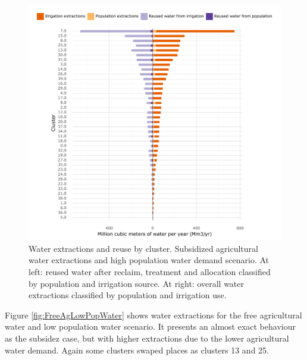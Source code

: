 \documentclass[12pt]{iopart}
\begin{document}
\begin{figure}[!h]
	\centering
	\includegraphics[width=\textwidth]{Sub_agri_water_High_pop_water}
	\caption{Water extractions and reuse by cluster. Subsidized agricultural water extractions and high population water demand scenario. At left: reused water after reclaim, treatment and allocation classified by population and irrigation source. At right: overall water extractions classified by population and irrigation use.}
	\label{fig:SubAgHighPopWater}
\end{figure}
\newpage

Figure \autoref{fig:FreeAgLowPopWater} shows water extractions for the free agricultural water and low population water scenario. It presents an almost exact behaviour as the subsidez case, but with higher extractions due to the lower agricultural water demand. Again some clusters swaped places as clusters 13 and 25.
\end{document}
